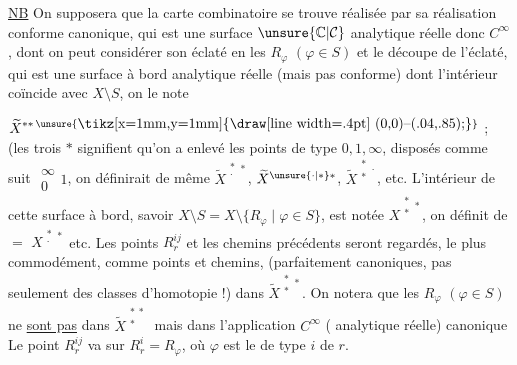 
\uline{NB} On supposera que la carte combinatoire se trouve réalisée par sa réalisation conforme canonique, qui est une surface $\unsure{\mathbb{C}|\mathcal{C}}$ analytique réelle donc $C^\infty$, dont on peut considérer son éclaté en les $R_\varphi$ $(\varphi\in S)$ et le découpe de l'éclaté, qui est une surface à bord analytique réelle (mais pas conforme) dont l'intérieur coïncide avec $X\setminus S$, on le note



$\widetilde{X}^{\substack{*\\*}*\,\unsure{\vcenter{\hbox{\tikz[x=1mm,y=1mm]{\draw[line width=.4pt] (0,0)--(.04,.85);}}}}}$ ; (les trois $*$ signifient qu'on a enlevé  les points de type $0,1,\infty$, disposés comme suit $\substack{\infty\\0}1$, on définirait de même $\widetilde{X}^{\substack{*\\\cdot}*}$, $\widetilde{X}^{\substack{\unsure{\cdot|*}\\*}*}$, $\widetilde{X}^{\substack{*\\*}\cdot}$, etc.  L'intérieur de cette surface à bord, savoir $X\setminus S=X\setminus\{R_\varphi\mid\varphi\in S\}$, est notée $X^{\substack{*\\*}*}$, on définit de $=$ $X^{\substack{*\\\cdot}*}$ etc. Les points $R_r^{ij}$ et les chemins précédents seront regardés, le plus commodément, comme points et chemins, (parfaitement canoniques, pas seulement des classes d'homotopie !) dans $\widetilde{X}^{\substack{*\\*}*}$. On notera que les $R_\varphi$ $(\varphi\in S)$ ne \uline{sont pas} dans $\widetilde{X}^{\substack{*\ *\\*}}$
mais dans l'application $C^\infty$ ( analytique réelle) canonique
Le point $R_r^{ij}$ va sur $R_r^i=R_\varphi$, où $\varphi$ est le   de type $i$ de $r$.

